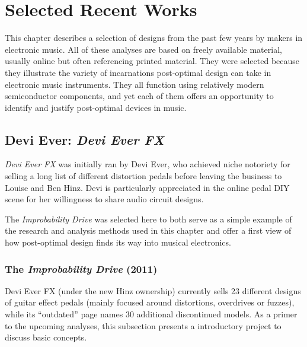 \chapter{Selected Recent Works}\label{selrecworks}

This chapter describes a selection of designs from the past few years by makers in electronic music. All of these analyses are based on freely available material, usually online but often referencing printed material. They were selected because they illustrate the variety of incarnations post-optimal design can take in electronic music instruments. They all function using relatively modern semiconductor components, and yet each of them offers an opportunity to identify and justify post-optimal devices in music.  
 
\newpage 

\section{Devi Ever: \textit{Devi Ever FX}}

\textit{Devi Ever FX} was initially ran by Devi Ever, who achieved niche notoriety for selling a long list of different distortion pedals before leaving the business to Louise and Ben Hinz. Devi is particularly appreciated in the online pedal DIY scene for her willingness to share audio circuit designs. 

The \emph{Improbability Drive} was selected here to both serve as a simple example of the research and analysis methods used in this chapter and offer a first view of how post-optimal design finds its way into musical electronics.

\subsection{The \textit{Improbability Drive} (2011)}

Devi Ever FX (under the new Hinz ownership) currently sells 23 different designs of guitar effect pedals (mainly focused around distortions, overdrives or fuzzes), while its ``outdated'' page names 30 additional discontinued models. As a primer to the upcoming analyses, this subsection presents a introductory project to discuss basic concepts. 

